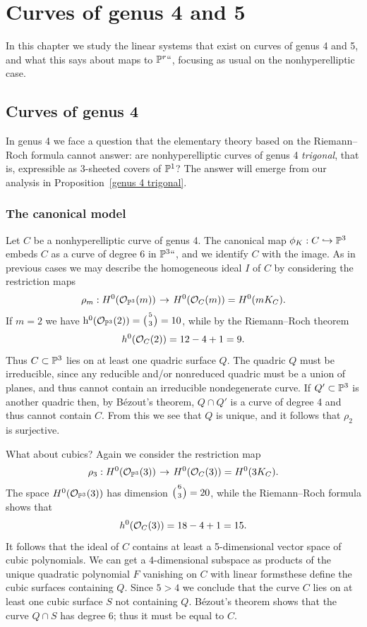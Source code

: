 

\chapter{Curves of genus 4 and 5}\label{genus 4, 5 Chapter}

In this chapter we
study
the linear systems that exist on curves of genus 4 and 5, and what this says
about maps to ${\mathbb P}^r` `$, focusing as usual on the nonhyperelliptic case.

\section{Curves of genus 4}

In genus 4 we
face
%
a question that the elementary theory based on the Riemann--Roch
formula cannot answer: are nonhyperelliptic curves of genus 4
%
%
\emph{trigonal}, that is, expressible as 3-sheeted covers of ${\mathbb P}^1$?
The answer will emerge from our analysis in
Proposition~\ref{genus 4 trigonal}.

\subsection*{The canonical model}

Let $C$ be a nonhyperelliptic curve of genus 4. The canonical map $\phi_K : C \hookrightarrow {\mathbb P}^3$  embeds $C$ as a curve of degree 6 in ${\mathbb P}^3` `$, and we identify $C$ with the image.  As in previous cases we may describe the homogeneous ideal  $I$ of $C$ by considering the restriction maps
$$
\rho_m : H^0(\cO_{\PP^3}(m)) \; \to \; H^0(\cO_{C}(m)) = H^0(mK_C).
$$
If
$m=2$ we have $\h^0(\cO_{\PP^3}(2)) = \tbinom{5}{3} = 10$, while by the
%
Riemann--Roch theorem
$$
h^0({\mathcal O}_C(2)) = 12 - 4 + 1 = 9.
$$
Thus $C \subset {\mathbb P}^3$  lies on at least one quadric surface $Q$. The quadric $Q$ must be irreducible, since any reducible and/or nonreduced quadric must be a union of planes, and thus cannot contain an irreducible nondegenerate curve.
If $Q'\subset\nobreak {\mathbb P}^3$ is another quadric then, by B\'ezout's theorem,
$Q\cap Q'$ is a curve of degree 4 and thus
cannot
contain $C$. From
this we see that $Q$ is unique, and it follows that $\rho_2$ is surjective.

What about cubics? Again we consider the restriction map
$$
\rho_3 : H^0(\cO_{\PP^3}(3)) \; \to \; H^0(\cO_{C}(3)) = H^0(3K_C).
$$
The space $H^0({\mathcal O}_{{\mathbb P}^3}(3))$ has dimension $\tbinom{6}{3} = 20$, while  the Riemann--Roch formula shows that
$$
h^0({\mathcal O}_C(3)) = 18 - 4 + 1 = 15.
$$
It follows that the ideal of $C$ contains at least a 5-dimensional vector space of cubic polynomials. We can get a 4-dimensional subspace as products of the unique quadratic polynomial $F$ vanishing on $C$ with linear forms\emdash these define the cubic surfaces containing $Q$. Since $5 > 4$ we  conclude that the curve $C$ lies on at least one cubic surface $S$  not containing $Q$.
B\'ezout's theorem
%
shows that the curve $Q \cap S$ has degree 6; thus it must be equal to $C$.

